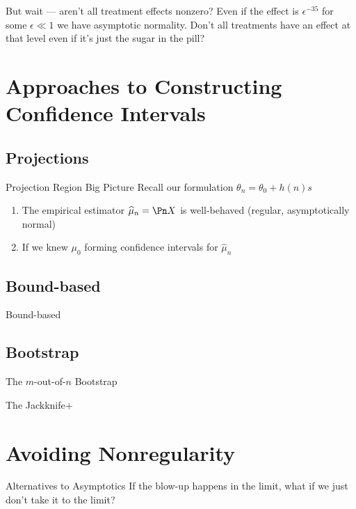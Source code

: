 \documentclass[aspectratio=169, professionalfonts]{beamer}
\begin{document}
\begin{frame}{But wait --- aren't all treatment effects nonzero?}
	Even if the effect is $\epsilon^{-35}$ for some $\epsilon \ll 1$ we have asymptotic
	normality. Don't all treatments have an  effect at that level even if it's
	just the sugar in the pill?
\end{frame}



\section{Approaches to Constructing Confidence Intervals}
\subsection{Projections}
\begin{frame}{Projection Region Big Picture}
	Recall our formulation $\theta_n = \theta_0 + h(n)s$
	\begin{enumerate}
		\item The empirical estimator $\widehat{\mu}_n = \Pn X$ is well-behaved (regular, asymptotically normal)
		\item If we knew $\mu_0$ forming confidence intervals for $\widehat{\mu}_n$
	\end{enumerate}
\end{frame}
\subsection{Bound-based}
\begin{frame}{Bound-based}
\end{frame}
\subsection{Bootstrap}
\begin{frame}{The $m$-out-of-$n$ Bootstrap}
\end{frame}

\begin{frame}{The Jackknife+}
\end{frame}

\section{Avoiding Nonregularity}
\begin{frame}{Alternatives to Asymptotics}
	If the blow-up happens in the limit, what if we just don't take it to the limit?


\end{frame}
\end{document}
